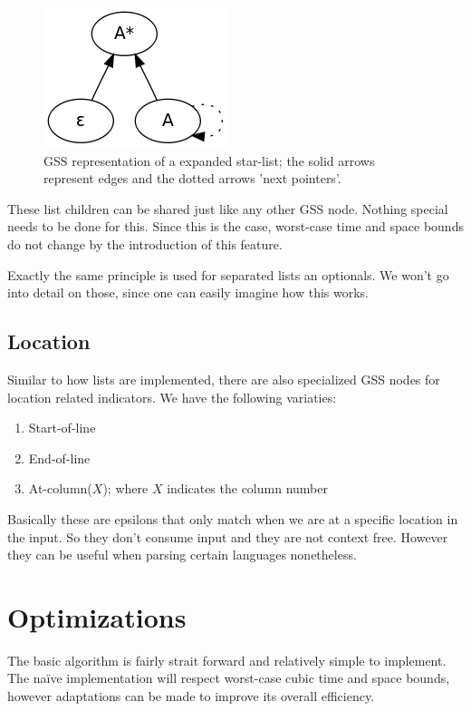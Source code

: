 \documentclass[a4paper,10pt]{article}
\begin{document}
\begin{figure}[H]
\centering
\includegraphics[scale=0.5]{star-list.png}
\caption{GSS representation of a expanded star-list; the solid arrows represent edges and the dotted arrows 'next pointers'.}
\end{figure}

These list children can be shared just like any other GSS node. Nothing special needs to be done for this. Since this is the case, worst-case time and space bounds do not change by the introduction of this feature.

Exactly the same principle is used for separated lists an optionals. We won't go into detail on those, since one can easily imagine how this works.

\subsection{Location}

Similar to how lists are implemented, there are also specialized GSS nodes for location related indicators. We have the following variaties:
\begin{enumerate}
 \setlength{\itemsep}{0pt}
 \setlength{\parskip}{0pt}
 \setlength{\parsep}{0pt}
 
 \item Start-of-line
 \item End-of-line
 \item At-column($X$); where $X$ indicates the column number
\end{enumerate}
Basically these are epsilons that only match when we are at a specific location in the input. So they don't consume input and they are not context free. However they can be useful when parsing certain languages nonetheless.

\section{Optimizations}

The basic algorithm is fairly strait forward and relatively simple to implement. The naïve implementation will respect worst-case cubic time and space bounds, however adaptations can be made to improve its overall efficiency.
\end{document}
